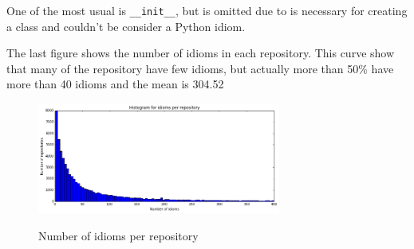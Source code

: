 \documentclass[conference]{IEEEtran}
\begin{document}
One of the most usual is \verb|__init__|, but is omitted due to is necessary for creating a class and couldn't be consider a Python idiom.

The last figure shows the number of idioms in each repository. This curve show that many of the repository have few idioms, but actually more than 50\% have more than 40 idioms and the mean is 304.52

\begin{figure}[ht]
\centering
\includegraphics[width=80mm]{img/idioms_per_repository.png}
\label{fig:idioms_per_repository}
\caption{Number of idioms per repository}
\end{figure}
\end{document}
